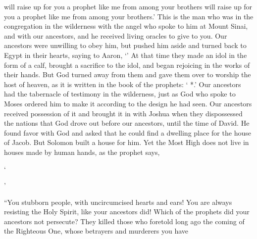{{{will raise up
for you
a prophet
like
me
from
among your
brothers
will raise up
for you
a prophet
like
me
from
among your
brothers}}.’
This
is
the man who was
in
the congregation
in
the wilderness
with
the angel
who spoke
to him
at
Mount
Sinai,
and
with our
ancestors,
and he received
living
oracles
to give
to you.
Our
ancestors
were unwilling
to obey
him, but
pushed
him aside
and
turned back
to
Egypt
in
their
hearts,
saying
to Aaron, ‘{}’
At
that
time
they made an idol in the form of a calf,
brought
a sacrifice
to the idol,
and
began rejoicing
in
the works
of their
hands.
But
God
turned away
from them and
gave
them
over
to worship
the host
of heaven,
as
it is written
in
the book
of the prophets: ‘{}
{}*.’
Our
ancestors
had
the tabernacle
of testimony
in
the wilderness,
just
as God who spoke
to Moses
ordered
him to make
it
according to
the design
he had seen.
Our
ancestors
received possession of it and
brought
it in with
Joshua
when they dispossessed
the nations
that
God
drove out
before
our
ancestors,
until
the time
of David.
He found
favor
with God
and
asked
that he could find
a dwelling place
for the house of Jacob.
But
Solomon
built
a house
for him.
Yet
the Most High
does
not
live
in
houses made by human hands,
as
the prophet
says,
\par }{\Q {}‘{}
\par }{
\par }{
\par }{
\par }{\Q {}’
\par }{\PP {}“You stubborn
people, with uncircumcised
hearts
and
ears! You
are
always
resisting
the Holy
Spirit,
like
your
ancestors did!
Which
of the prophets
did
your
ancestors
not
persecute? They killed
those who foretold long ago
the coming
of the Righteous One,
whose
betrayers
and
murderers
you
have
}
